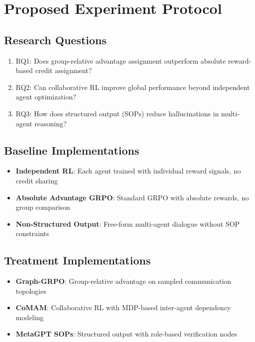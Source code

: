 \documentclass[11pt]{article}
\begin{document}
\section{Proposed Experiment Protocol}

\subsection{Research Questions}
\begin{enumerate}
\item RQ1: Does group-relative advantage assignment outperform absolute reward-based credit assignment?
\item RQ2: Can collaborative RL improve global performance beyond independent agent optimization?
\item RQ3: How does structured output (SOPs) reduce hallucinations in multi-agent reasoning?
\end{enumerate}

\subsection{Baseline Implementations}
\begin{itemize}
\item \textbf{Independent RL}: Each agent trained with individual reward signals, no credit sharing
\item \textbf{Absolute Advantage GRPO}: Standard GRPO with absolute rewards, no group comparison
\item \textbf{Non-Structured Output}: Free-form multi-agent dialogue without SOP constraints
\end{itemize}

\subsection{Treatment Implementations}
\begin{itemize}
\item \textbf{Graph-GRPO}: Group-relative advantage on sampled communication topologies
\item \textbf{CoMAM}: Collaborative RL with MDP-based inter-agent dependency modeling
\item \textbf{MetaGPT SOPs}: Structured output with role-based verification nodes
\end{itemize}
\end{document}
